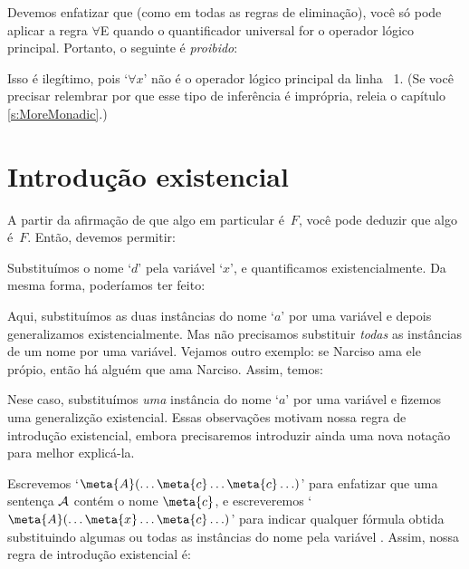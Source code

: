 Devemos enfatizar que (como em todas as regras de elimina\c c\~ao), voc\^e s\'o pode aplicar a regra $\forall$E quando o quantificador universal for o operador l\'ogico principal. Portanto, o seguinte \'e \emph{proibido}:
\begin{fitchproof}
\end{fitchproof}
Isso \'e ileg\'itimo, pois `$\forall x$' n\~ao \'e o  operador l\'ogico principal da linha ~1. (Se voc\^e precisar relembrar por que esse tipo de infer\^encia \'e impr\'opria, releia o  cap\'itulo \ref{s:MoreMonadic}.)


\section{Introdu\c c\~ao existencial}
A partir da afirma\c c\~ao de que algo em particular \'e~$F$, voc\^e pode deduzir que algo \'e~$F$. Ent\~ao, devemos permitir:
\begin{fitchproof}
	 
\end{fitchproof}
 
Substitu\'imos o nome `$d$' pela vari\'avel `$x$',  e  quantificamos existencialmente. Da mesma forma,  poder\'iamos ter feito:
\begin{fitchproof}
	 
\end{fitchproof}
Aqui,  substitu\'imos as duas inst\^ancias do nome `$a$' por uma vari\'avel e depois generalizamos existencialmente. Mas n\~ao precisamos substituir  \emph{todas}  as inst\^ancias de um nome por  uma vari\'avel.  Vejamos outro exemplo: se Narciso ama ele pr\'opio, ent\~ao h\'a algu\'em que ama Narciso. Assim, temos:
\begin{fitchproof}
	 
\end{fitchproof}
Nese caso, substitu\'imos \emph{uma} inst\^ancia do nome `$a$' por uma vari\'avel   e  fizemos uma  generaliz\c c\~ao  existencial. Essas observa\c c\~oes motivam nossa regra de introdu\c c\~ao existencial,  embora  precisaremos introduzir ainda uma nova nota\c c\~ao  para melhor explic\'a-la.

Escrevemos  `$\meta{A}(\ldots \meta{c} \ldots \meta{c}\ldots)$' para enfatizar que uma senten\c ca
 $\mathcal{A}$ cont\'em o nome $\meta{c}$,  e escreveremos `$\meta{A}(\ldots \meta{x} \ldots \meta{c}\ldots)$' para indicar qualquer f\'ormula obtida substituindo algumas ou todas as inst\^ancias do nome   pela vari\'avel .  Assim, nossa regra de introdu\c c\~ao existencial \'e:
 
